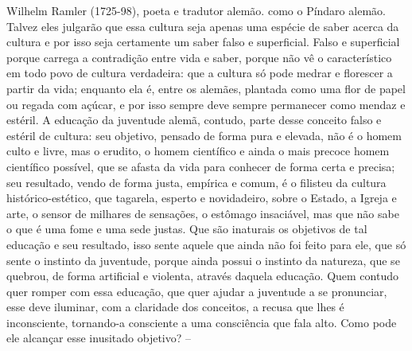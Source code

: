 \begin{enumerate}
\begin{enumerate}
{      Wilhelm Ramler (1725-98), poeta e tradutor alemão.} como o Píndaro
    alemão. Talvez eles julgarão que essa cultura seja apenas uma
    espécie de saber acerca da cultura e por isso seja certamente um
    saber falso e superficial. Falso e superficial porque carrega a
    contradição entre vida e saber, porque não vê o característico em
    todo povo de cultura verdadeira: que a cultura só pode medrar e
    florescer a partir da vida; enquanto ela é, entre os alemães,
    plantada como uma flor de papel ou regada com açúcar, e por isso
    sempre deve sempre permanecer como mendaz e estéril. A educação da
    juventude alemã, contudo, parte desse conceito falso e estéril de
    cultura: seu objetivo, pensado de forma pura e elevada, não é o
    homem culto e livre, mas o erudito, o homem científico e ainda o
    mais precoce homem científico possível, que se afasta da vida para
    conhecer de forma certa e precisa; seu resultado, vendo de forma
    justa, empírica e comum, é o filisteu da cultura histórico-estético,
    que tagarela, esperto e novidadeiro, sobre o Estado, a Igreja e
    arte, o sensor de milhares de sensações, o estômago insaciável, mas
    que não sabe o que é uma fome e uma sede justas. Que são inaturais
    os objetivos de tal educação e seu resultado, isso sente aquele que
    ainda não foi feito para ele, que só sente o instinto da juventude,
    porque ainda possui o instinto da natureza, que se quebrou, de forma
    artificial e violenta, através daquela educação. Quem contudo quer
    romper com essa educação, que quer ajudar a juventude a se
    pronunciar, esse deve iluminar, com a claridade dos conceitos, a
    recusa que lhes é inconsciente, tornando-a consciente a uma
    consciência que fala alto. Como pode ele alcançar esse inusitado
    objetivo? --


\end{enumerate}
\end{enumerate}
